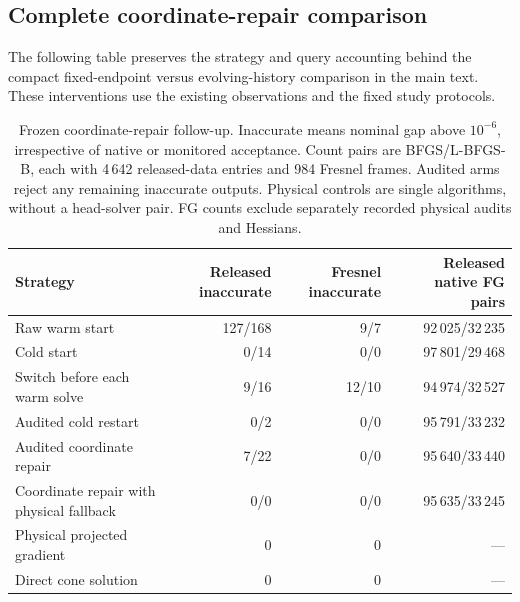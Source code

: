 \subsection{Complete coordinate-repair comparison}
The following table preserves the strategy and query accounting behind the compact fixed-endpoint versus evolving-history comparison in the main text. These interventions use the existing observations and the fixed study protocols.
\begin{table}[H]
\caption{Frozen coordinate-repair follow-up. Inaccurate means nominal gap above $10^{-6}$, irrespective of native or monitored acceptance. Count pairs are BFGS/L-BFGS-B, each with 4\,642 released-data entries and 984 Fresnel frames. Audited arms reject any remaining inaccurate outputs. Physical controls are single algorithms, without a head-solver pair. FG counts exclude separately recorded physical audits and Hessians.}
\label{SI-tab:chartrepairdetail}
\centering\small\renewcommand{\arraystretch}{1.12}
\begin{tabularx}{\textwidth}{@{}Xrrr@{}}\toprule
Strategy & Released inaccurate & Fresnel inaccurate & Released native FG pairs\\\midrule
Raw warm start & 127/168 & 9/7 & 92\,025/32\,235\\
Cold start & 0/14 & 0/0 & 97\,801/29\,468\\
Switch before each warm solve & 9/16 & 12/10 & 94\,974/32\,527\\
Audited cold restart & 0/2 & 0/0 & 95\,791/33\,232\\
Audited coordinate repair & 7/22 & 0/0 & 95\,640/33\,440\\
Coordinate repair with physical fallback & 0/0 & 0/0 & 95\,635/33\,245\\
Physical projected gradient & 0 & 0 & ---\\
Direct cone solution & 0 & 0 & ---\\\bottomrule
\end{tabularx}
\end{table}
\FloatBarrier


